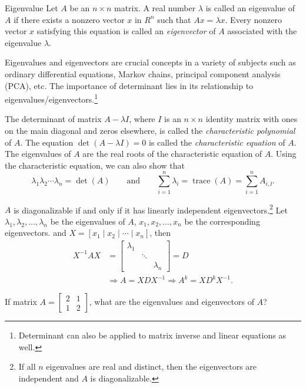 \begin{concept}{Eigenvalue}
Let \(A\) be an \(n\times n\) matrix. A real number \(\lambda\) is called an eigenvalue of \(A\) if there exists a nonzero vector \(x\) in \(R^n\) such that \(Ax=\lambda x\). Every nonzero vector \(x\) satisfying this equation is called an \emph{eigenvector} of \(A\) associated with the eigenvalue \(\lambda\).

Eigenvalues and eigenvectors are crucial concepts in a variety of subjects such as ordinary differential equations, Markov chains, principal component analysis (PCA), etc. The importance of determinant lies in its relationship to eigenvalues/eigenvectors.\footnote[14]{Determinant can also be applied to matrix inverse and linear equations as well.}

The determinant of matrix \(A-\lambda I\), where \(I\) is an \(n\times n\) identity matrix with ones on the main diagonal and zeros elsewhere, is called the \emph{characteristic polynomial} of \(A\). The equation \(\det(A-\lambda I)=0\) is called the \emph{characteristic equation} of \(A\). The eigenvalues of \(A\) are the real roots of the characteristic equation of \(A\). Using the characteristic equation, we can also show that
\[
\lambda_1\lambda_2\cdots\lambda_n=\det(A)\qquad\text{and}\qquad
\sum_{i=1}^{n}\lambda_i=\operatorname{trace}(A)=\sum_{i=1}^{n}A_{i,\ii}.
\]

\(A\) is diagonalizable if and only if it has linearly independent eigenvectors.\footnote[15]{If all \(n\) eigenvalues are real and distinct, then the eigenvectors are independent and \(A\) is diagonalizable.} Let \(\lambda_1,\lambda_2,\ldots,\lambda_n\) be the eigenvalues of \(A\), \(x_1,x_2,\ldots,x_n\) be the corresponding eigenvectors. and \(X=[x_1\mid x_2\mid\cdots\mid x_n]\), then
\[
\begin{aligned}
X^{-1}AX&=\begin{bmatrix}\lambda_1&&\\&\ddots&\\&&\lambda_n\end{bmatrix}=D\\
&\Rightarrow A=XDX^{-1}\Rightarrow A^k=XD^kX^{-1}.
\end{aligned}
\]
\end{concept}

\begin{problem}{If matrix \(A=\begin{bmatrix}2&1\\1&2\end{bmatrix}\), what are the eigenvalues and eigenvectors of \(A\)?}
\end{problem}

